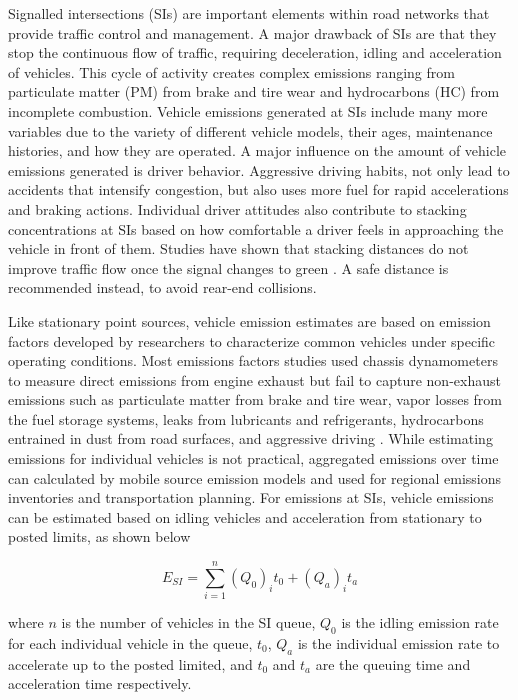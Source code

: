 Signalled intersections (SIs) are important elements within road networks that provide traffic control and management. A major drawback of SIs are that they stop the continuous flow of traffic, requiring deceleration, idling and acceleration of vehicles. This cycle of activity creates complex emissions ranging from particulate matter (PM) from brake and tire wear and hydrocarbons (HC) from incomplete combustion. Vehicle emissions generated at SIs include many more variables due to the variety of different vehicle models, their ages, maintenance histories, and how they are operated. A major influence on the amount of  vehicle emissions generated is driver behavior. Aggressive driving habits, not only lead to accidents that intensify congestion, but also uses more fuel for rapid accelerations and braking actions. Individual driver attitudes also contribute to stacking concentrations at SIs based on how comfortable a driver feels in approaching the vehicle in front of them. Studies have shown that stacking distances do not improve traffic flow once the signal changes to green  \citep{Ahmadi2017}. A safe distance is recommended instead, to avoid rear-end collisions.

Like stationary point sources, vehicle emission estimates are based on emission factors developed by researchers to characterize common vehicles under specific operating conditions. Most emissions factors studies used chassis dynamometers to measure direct emissions from engine exhaust but fail to capture non-exhaust emissions such as particulate matter from brake and tire wear, vapor losses from the fuel storage systems, leaks from lubricants and refrigerants, hydrocarbons entrained in dust from road surfaces, and aggressive driving \citep{Kam2012, Franco2013, Freeman2015a}. While estimating emissions for individual vehicles is not practical, aggregated emissions over time can calculated by mobile source emission models and used for regional emissions inventories and transportation planning. For emissions at SIs, vehicle emissions can be estimated based on idling vehicles and acceleration from stationary to posted limits, as shown below

\begin{equation}
\label{eq:siemissions}
E_{SI}=\sum_{i=1}^{n}(Q_{0})_{i}t_{0} + (Q_{a})_{i}t_{a}
\end{equation}

\noindent
where $n$ is the number of vehicles in the SI queue, $Q_{0}$ is the idling emission rate for each individual vehicle in the queue, $t_{0}$,  $Q_{a}$ is the individual emission rate to accelerate up to the posted limited, and $t_{0}$   and $t_{a}$ are the queuing time and acceleration time respectively.

